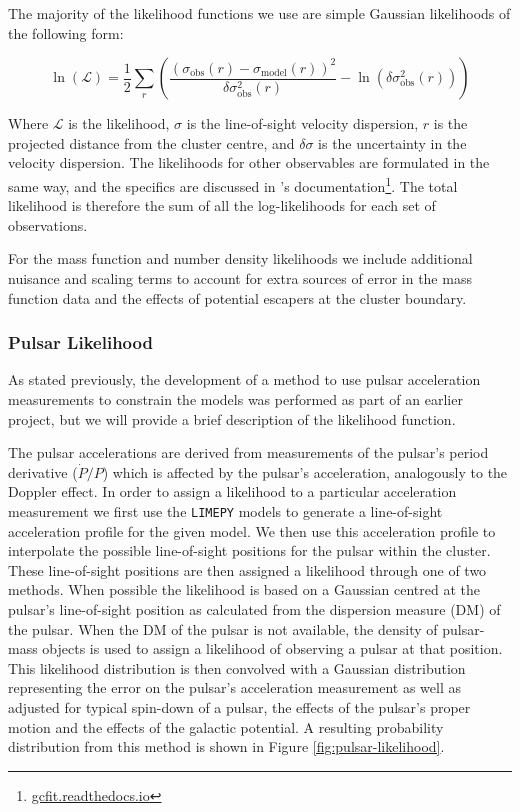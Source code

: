 The majority of the likelihood functions we use are simple Gaussian likelihoods of the following
form:

\begin{equation}
    \ln \left(\mathcal{L}\right)=\frac{1}{2}
    \sum_{r}\left(\frac{\left(\sigma_{\mathrm{obs}}(r)
        -\sigma_{\mathrm{model}}(r)\right)^{2}}{\delta \sigma_{\mathrm{obs}}^{2}(r)}
    -\ln \left(\delta \sigma_{\mathrm{obs}}^{2}(r)\right)\right)
\end{equation}

Where $\mathcal{L}$ is the likelihood, $\sigma$ is the line-of-sight velocity dispersion, $r$ is the
projected distance from the cluster centre, and $\delta \sigma$ is the uncertainty in the velocity
dispersion. The likelihoods for other observables are formulated in the same way, and the specifics
are discussed in 's documentation\footnote{\url{gcfit.readthedocs.io}}. The total
likelihood is therefore the sum of all the log-likelihoods for each set of observations.

For the mass function and number density likelihoods we include additional nuisance and scaling
terms to account for extra sources of error in the mass function data and the effects of potential
escapers at the cluster boundary.

\subsubsection{Pulsar Likelihood}

As stated previously, the development of a method to use pulsar acceleration measurements to
constrain the models was performed as part of an earlier project, but we will provide a brief
description of the likelihood function.

The pulsar accelerations are derived from measurements of the pulsar's period derivative
($\dot{P}/P$) which is affected by the pulsar's acceleration, analogously to the Doppler effect. In
order to assign a likelihood to a particular acceleration measurement we first use the
\texttt{LIMEPY} models to generate a line-of-sight acceleration profile for the given model. We then
use this acceleration profile to interpolate the possible line-of-sight positions for the pulsar
within the cluster. These line-of-sight positions are then assigned a likelihood through one of two
methods. When possible the likelihood is based on a Gaussian centred at the pulsar's line-of-sight
position as calculated from the dispersion measure (DM) of the pulsar. When the DM of the pulsar is
not available, the density of pulsar-mass objects is used to assign a likelihood of observing a
pulsar at that position. This likelihood distribution is then convolved with a Gaussian distribution
representing the error on the pulsar's acceleration measurement as well as adjusted for typical
spin-down of a pulsar, the effects of the pulsar's proper motion and the effects of the galactic
potential. A resulting probability distribution from this method is shown in Figure
\ref{fig:pulsar-likelihood}.

